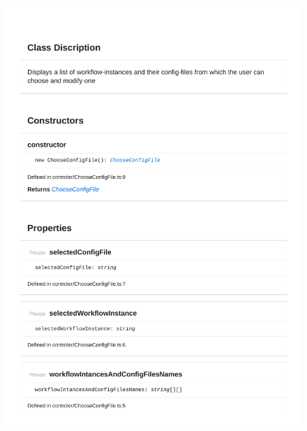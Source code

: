 \begin{figure}[H]
\centerline{\includegraphics[width=1\textwidth]{FrontendDocsAsPDF/Model/ChooseConfigFile.pdf}}
\end{figure}

